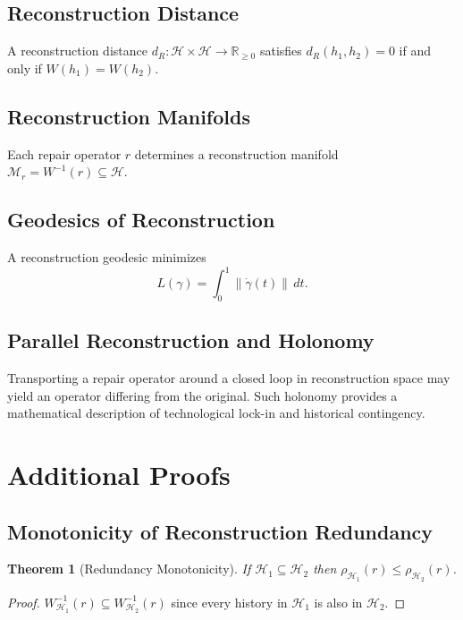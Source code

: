 \documentclass[12pt,oneside]{article}
\theoremstyle{plain}
\newtheorem{theorem}{Theorem}[section]
\theoremstyle{definition}
\theoremstyle{remark}
\theoremstyle{plain}
\newcommand{\Hist}{\mathcal{H}}
\begin{document}
\subsection{Reconstruction Distance}

A reconstruction distance $d_R : \Hist \times \Hist \rightarrow \mathbb{R}_{\ge 0}$ satisfies
$d_R(h_1, h_2) = 0$ if and only if $W(h_1) = W(h_2)$.

\subsection{Reconstruction Manifolds}

Each repair operator $r$ determines a reconstruction manifold
$\mathcal{M}_r = W^{-1}(r) \subseteq \Hist$.

\subsection{Geodesics of Reconstruction}

A reconstruction geodesic minimizes
\[
L(\gamma) = \int_0^1 \|\dot\gamma(t)\|\,dt.
\]

\subsection{Parallel Reconstruction and Holonomy}

Transporting a repair operator around a closed loop in reconstruction space may yield an operator
differing from the original. Such holonomy provides a mathematical description of technological
lock-in and historical contingency.

\section{Additional Proofs}

\subsection{Monotonicity of Reconstruction Redundancy}

\begin{theorem}[Redundancy Monotonicity]
If $\mathcal{H}_1 \subseteq \mathcal{H}_2$ then $\rho_{\mathcal{H}_1}(r) \le
\rho_{\mathcal{H}_2}(r)$.
\end{theorem}

\begin{proof}
$W^{-1}_{\mathcal{H}_1}(r) \subseteq W^{-1}_{\mathcal{H}_2}(r)$ since every history in
$\mathcal{H}_1$ is also in $\mathcal{H}_2$.
\end{proof}
\end{document}
